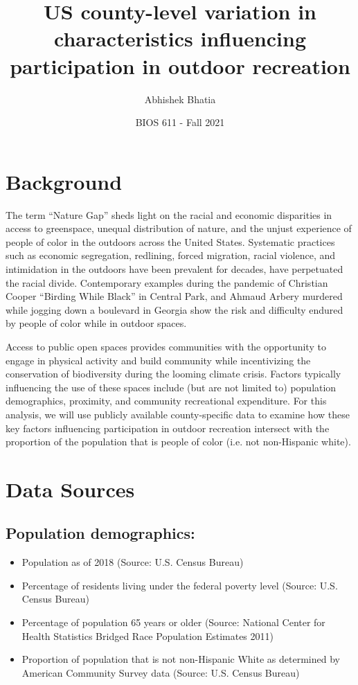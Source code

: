 \documentclass{article}
\begin{document}
\title{US county-level variation in characteristics influencing participation in outdoor recreation}
\author{Abhishek Bhatia}
\date{BIOS 611 - Fall 2021}
\maketitle


\section{Background}


The term ``Nature Gap'' sheds light on the racial and economic disparities in access to greenspace, unequal distribution of nature, and the unjust experience of people of color in the outdoors across the United States. Systematic practices such as economic segregation, redlining, forced migration, racial violence, and intimidation in the outdoors have been prevalent for decades, have perpetuated the racial divide. Contemporary examples during the pandemic of Christian Cooper ``Birding While Black'' in Central Park, and Ahmaud Arbery murdered while jogging down a boulevard in Georgia show the risk and difficulty endured by people of color while in outdoor spaces.

Access to public open spaces provides communities with the opportunity to engage in physical activity and build community while incentivizing the conservation of biodiversity during the looming climate crisis. Factors typically influencing the use of these spaces include (but are not limited to) population demographics, proximity, and community recreational expenditure. For this analysis, we will use publicly available county-specific data to examine how these key factors influencing participation in outdoor recreation intersect with the proportion of the population that is people of color (i.e. not non-Hispanic white).

\section{\textbf{Data Sources}}
\subsection{Population demographics:}
\begin{itemize}
\item Population as of 2018 (Source: U.S. Census Bureau)
\item Percentage of residents living under the federal poverty level (Source: U.S. Census Bureau)
\item Percentage of population 65 years or older (Source: National Center for Health Statistics Bridged Race Population Estimates 2011)
\item Proportion of population that is not non-Hispanic White as determined by American Community Survey data (Source: U.S. Census Bureau)
\end{itemize}
\end{document}
